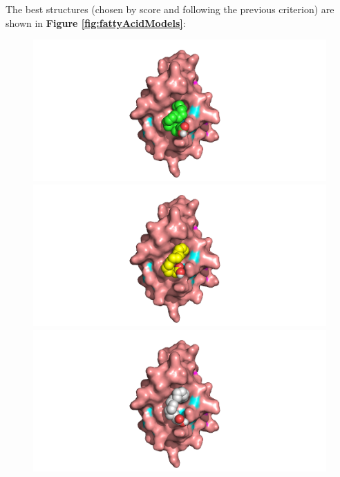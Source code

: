 The best structures (chosen by score and following the previous criterion) are shown in \textbf{Figure \ref{fig:fattyAcidModels}}:

\begin{figure}[htbp!]
        \includegraphics[trim={6.5cm 0 6.5cm 0},clip,width=\linewidth]{assets/RRM1_oleic_solo.png}
    \endminipage\hfill
        \includegraphics[trim={6.5cm 0 5.5cm 0},clip,width=\linewidth]{assets/RRM1_linoleic_solo.png}
    \endminipage\hfill
        \includegraphics[trim={6.5cm 0 7cm 0},clip,width=\linewidth]{assets/RRM1_stearic_solo.png}
    \endminipage\\

\end{figure}
